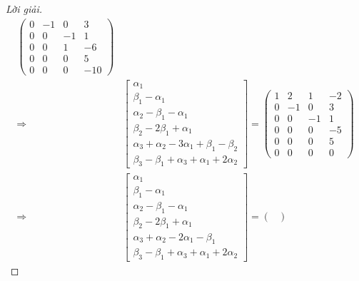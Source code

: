 \documentclass[class=linearalgebra,crop=false]{standalone}
\begin{document}
\begin{proof}[Lời giải]
\begin{align*}
\begin{pmatrix}
            0 & -1 & 0  & 3   \\
            0 & 0  & -1 & 1   \\
            0 & 0  & 1  & -6  \\
            0 & 0  & 0  & 5   \\
            0 & 0  & 0  & -10
        \end{pmatrix}                \\
        \Longrightarrow &
        \begin{bmatrix}
            \alpha_{1}                                                    \\
            \beta_{1} - \alpha_{1}                                        \\
            \alpha_{2} - \beta_{1} - \alpha_{1}                           \\
            \beta_{2} - 2\beta_{1} + \alpha_{1}                           \\
            \alpha_{3} + \alpha_{2} - 3\alpha_{1} + \beta_{1} - \beta_{2} \\
            \beta_{3} - \beta_{1} + \alpha_{3} + \alpha_{1} + 2\alpha_{2}
        \end{bmatrix}=
        \begin{pmatrix}
            1 & 2  & 1  & -2 \\
            0 & -1 & 0  & 3  \\
            0 & 0  & -1 & 1  \\
            0 & 0  & 0  & -5 \\
            0 & 0  & 0  & 5  \\
            0 & 0  & 0  & 0
        \end{pmatrix}                 \\
        \Longrightarrow &
        \begin{bmatrix}
            \alpha_{1}                                        \\
            \beta_{1} - \alpha_{1}                            \\
            \alpha_{2} - \beta_{1} - \alpha_{1}               \\
            \beta_{2} - 2\beta_{1} + \alpha_{1}               \\
            \alpha_{3} + \alpha_{2} - 2\alpha_{1} - \beta_{1} \\
            \beta_{3} - \beta_{1} + \alpha_{3} + \alpha_{1} + 2\alpha_{2}
        \end{bmatrix}=
        \begin{pmatrix}

\end{pmatrix}
\end{align*}
\end{proof}
\end{document}
